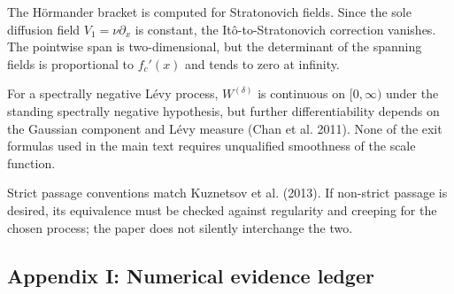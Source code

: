 \documentclass[
  english,
  11pt,
  letterpaper,
  DIV=11,
  numbers=noendperiod]{scrartcl}
\theoremstyle{plain}
\theoremstyle{plain}
\theoremstyle{plain}
\theoremstyle{plain}
\theoremstyle{remark}
\begin{document}
The Hörmander bracket is computed for Stratonovich fields. Since the
sole diffusion field \(V_1=\nu\partial_x\) is constant, the
Itô-to-Stratonovich correction vanishes. The pointwise span is
two-dimensional, but the determinant of the spanning fields is
proportional to \(f_c'(x)\) and tends to zero at infinity.

For a spectrally negative Lévy process, \(W^{(\delta)}\) is continuous
on \([0,\infty)\) under the standing spectrally negative hypothesis, but
further differentiability depends on the Gaussian component and Lévy
measure (Chan et al. 2011). None of the exit formulas used in the main
text requires unqualified smoothness of the scale function.

Strict passage conventions match Kuznetsov et al. (2013). If non-strict
passage is desired, its equivalence must be checked against regularity
and creeping for the chosen process; the paper does not silently
interchange the two.

\subsection{Appendix I: Numerical evidence
ledger}\label{sec-app-numerics}
\end{document}
